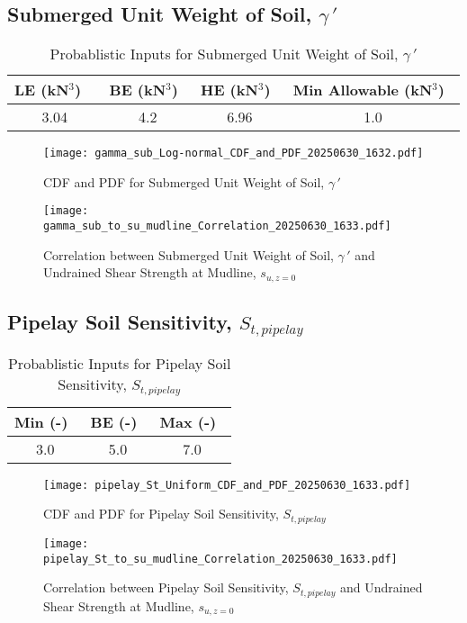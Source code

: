 \documentclass{article}
\begin{document}
\subsection*{Submerged Unit Weight of Soil, $\gamma\,'$}
\begin{table}[h!]
\centering
\caption{Probablistic Inputs for Submerged Unit Weight of Soil, $\gamma\,'$}
\begin{tabular}{|c|c|c|c|}
\hline
LE (kN$^3$) \ & BE (kN$^3$)\ & HE (kN$^3$)\ & Min Allowable (kN$^3$)\ \\
\hline
3.04 & 4.2 & 6.96 & 1.0 \\
\hline
\end{tabular}
\end{table}
\begin{figure}[h!]
\centering
\texttt{[image: gamma\_sub\_Log-normal\_CDF\_and\_PDF\_20250630\_1632.pdf]}
\caption{CDF and PDF for Submerged Unit Weight of Soil, $\gamma\,'$}
\end{figure}
\begin{figure}[h!]
\centering
\texttt{[image: gamma\_sub\_to\_su\_mudline\_Correlation\_20250630\_1633.pdf]}
\caption{Correlation between Submerged Unit Weight of Soil, $\gamma\,'$ and Undrained Shear Strength at Mudline, $s_{{u,z=0}}$}
\end{figure}
\clearpage
\subsection*{Pipelay Soil Sensitivity, $S_{{t,pipelay}}$}
\begin{table}[h!]
\centering
\caption{Probablistic Inputs for Pipelay Soil Sensitivity, $S_{{t,pipelay}}$}
\begin{tabular}{|c|c|c|}
\hline
Min (-)\ & BE (-)\ & Max (-)\ \\
\hline
3.0 & 5.0 & 7.0 \\
\hline
\end{tabular}
\end{table}
\begin{figure}[h!]
\centering
\texttt{[image: pipelay\_St\_Uniform\_CDF\_and\_PDF\_20250630\_1633.pdf]}
\caption{CDF and PDF for Pipelay Soil Sensitivity, $S_{{t,pipelay}}$}
\end{figure}
\begin{figure}[h!]
\centering
\texttt{[image: pipelay\_St\_to\_su\_mudline\_Correlation\_20250630\_1633.pdf]}
\caption{Correlation between Pipelay Soil Sensitivity, $S_{{t,pipelay}}$ and Undrained Shear Strength at Mudline, $s_{{u,z=0}}$}
\end{figure}
\clearpage
\end{document}

